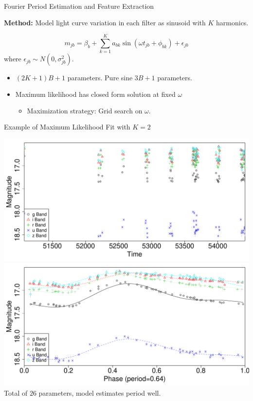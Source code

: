 \documentclass[12pt]{beamer}
\begin{document}
\begin{frame}{Fourier Period Estimation and Feature Extraction}

\textbf{Method:} Model light curve variation in each filter as sinusoid with $K$ harmonics. \cite{mondrik2015multiband,zechmeister2009generalised,lomb1976least,scargle1982studies,schwarzenberg1996fast}

\begin{equation*}
m_{jb} = \beta_b + \sum_{k=1}^K a_{bk}\sin(\omega t_{jb} + \phi_{bk}) + \epsilon_{jb}
\end{equation*}
where $\epsilon_{jb} \sim N(0,\sigma_{jb}^2)$.

\begin{itemize}
\item $(2K + 1)B + 1$ parameters. Pure sine $3B + 1$ parameters.
\item Maximum likelihood has closed form solution at fixed $\omega$
\begin{itemize}
\item Maximization strategy: Grid search on $\omega$.
\end{itemize}
\end{itemize}

\end{frame}


\begin{frame}{Example of Maximum Likelihood Fit with $K=2$}

\vspace{-.1in}

\begin{center}
\includegraphics[scale=.25]{figs/rrlyrae_nomodel_fit.pdf}\\
\includegraphics[scale=.25]{figs/rrlyrae_model_fit.pdf}\\
Total of $26$ parameters, model estimates period well.
\end{center}

\end{frame}
\end{document}
